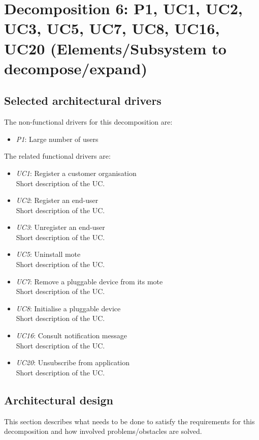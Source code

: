 \section{Decomposition 6: P1, UC1, UC2, UC3, UC5, UC7, UC8, UC16, UC20 (Elements/Subsystem to decompose/expand)}


\subsection{Selected architectural drivers}
    The non-functional drivers for this decomposition are:
    \begin{itemize}
    	\item \emph{P1}: Large number of users
    \end{itemize}

    The related functional drivers are:
    \begin{itemize}
        \item \emph{UC1}: Register a customer organisation \\
            Short description of the UC.
        \item \emph{UC2}: Register an end-user \\
            Short description of the UC.
        \item \emph{UC3}: Unregister an end-user \\
            Short description of the UC.
        \item \emph{UC5}: Uninstall mote \\
            Short description of the UC.
        \item \emph{UC7}: Remove a pluggable device from its mote \\
            Short description of the UC.
        \item \emph{UC8}: Initialise a pluggable device \\
            Short description of the UC.
        \item \emph{UC16}: Consult notification message \\
            Short description of the UC.
        \item \emph{UC20}: Unsubscribe from application \\
            Short description of the UC.
    \end{itemize}


\subsection{Architectural design}
    This section describes what needs to be done to satisfy the requirements for
    this decomposition and how involved problems/obstacles are solved.

